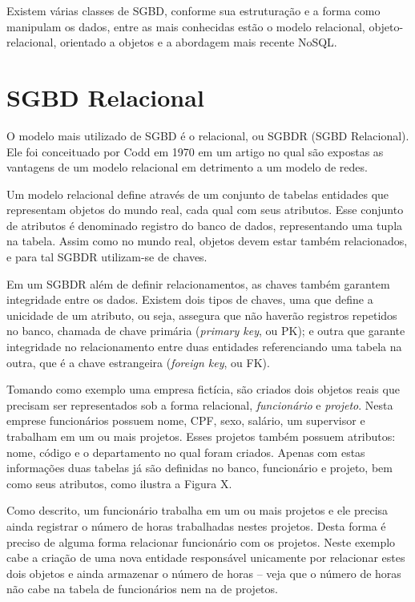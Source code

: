 Existem várias classes de SGBD, conforme sua estruturação e a forma como manipulam os dados, 
entre as mais conhecidas estão o modelo relacional, objeto-relacional, orientado a 
objetos e a abordagem mais recente NoSQL.

\section{SGBD Relacional}

O modelo mais utilizado de SGBD é o relacional, ou SGBDR (SGBD Relacional). Ele foi conceituado por 
Codd \cite{codd1970relational} em 1970 em um artigo no qual são expostas as 
vantagens de um modelo relacional em detrimento a um modelo de redes. 

Um modelo relacional define através de um conjunto de tabelas entidades que representam 
objetos do mundo real, cada qual com seus atributos. Esse conjunto de atributos é 
denominado registro do banco de dados, representando uma tupla na tabela. Assim como no mundo real, 
objetos devem estar também relacionados, e para tal SGBDR utilizam-se de chaves.

Em um SGBDR além de definir relacionamentos, as chaves também garantem integridade entre os dados. 
Existem dois tipos de chaves, uma que define a unicidade de um atributo, ou seja, assegura que 
não haverão registros repetidos no banco, chamada de chave primária (\textit{primary key}, ou PK); e 
outra que garante integridade no relacionamento entre duas entidades referenciando uma tabela na outra, que 
é a chave estrangeira (\textit{foreign key}, ou FK).

Tomando como exemplo uma empresa fictícia, são criados dois objetos reais que precisam ser 
representados sob a forma relacional, \textit{funcionário} e \textit{projeto}. Nesta emprese funcionários possuem nome, 
CPF, sexo, salário, um supervisor e trabalham em um ou mais projetos. Esses projetos também possuem atributos: 
nome, código e o departamento no qual foram criados. Apenas com estas informações duas tabelas já são definidas 
no banco, funcionário e projeto, bem como seus atributos, como ilustra a Figura X.

Como descrito, um funcionário trabalha em um ou mais projetos e ele precisa ainda registrar o número 
de horas trabalhadas nestes projetos. Desta forma é preciso de alguma forma relacionar funcionário com os projetos. 
Neste exemplo cabe a criação de uma nova entidade responsável unicamente por relacionar estes dois objetos e ainda 
armazenar o número de horas -- veja que o número de horas não cabe na tabela de funcionários nem na de projetos.

